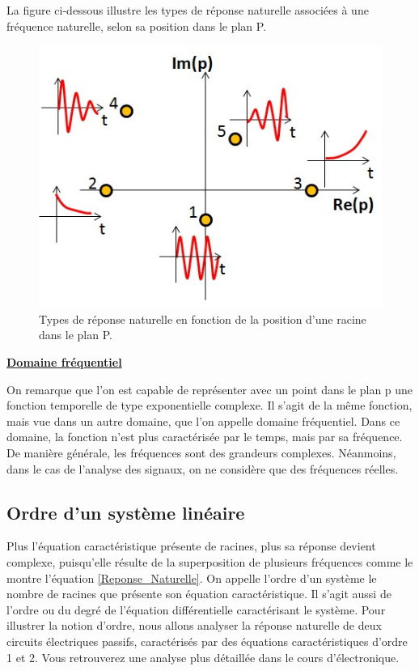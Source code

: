 	La figure ci-dessous illustre les types de réponse naturelle associées à une fréquence naturelle, selon sa position dans le plan P.
	\begin{figure}[h!]
		\centering
		\includegraphics[scale=0.5]{images/reponse_vs_p.jpg} 
		\caption{Types de réponse naturelle en fonction de la position d'une racine dans le plan P.}	
		\label{Fig:reponse_vs_p}
	\end{figure}
	
	\textbf{\underline{Domaine fréquentiel}}
	
	On remarque que l'on est capable de représenter avec un point dans le
	plan p une fonction temporelle de type exponentielle complexe. Il s'agit de la même fonction, mais vue
	dans un autre domaine, que l'on appelle domaine fréquentiel. Dans ce domaine, la fonction n'est plus caractérisée par le temps, mais par sa fréquence. De manière générale, les fréquences sont des grandeurs complexes. Néanmoins, dans le cas de l'analyse des signaux, on ne considère que des fréquences réelles.
	
	
	\subsection{Ordre d'un système linéaire}
	
	Plus l'équation caractéristique présente de racines, plus sa réponse
	devient complexe, puisqu'elle résulte de la superposition de plusieurs
	fréquences  comme le montre l'équation \ref{Reponse_Naturelle}. On appelle l'ordre
	d'un système le nombre de racines que présente son équation
	caractéristique. Il s'agit aussi de l'ordre ou du degré de l'équation
	différentielle caractérisant le système. Pour illustrer la notion
	d'ordre, nous allons analyser la réponse naturelle de deux circuits
	électriques passifs, caractérisés par des équations caractéristiques d'ordre 1 et 2. Vous retrouverez une analyse plus détaillée dans le cours d'électronique.
	
